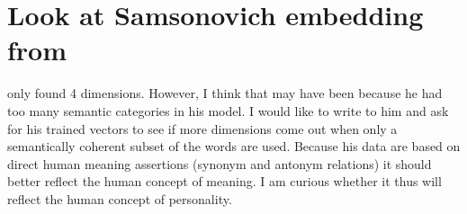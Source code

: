 \section{Look at Samsonovich embedding from }

\citep{Samsonovich2010} only found 4 dimensions. However, I think that may have been 
because he had too many semantic categories in his model. I would like to
write to him and ask for his trained vectors to see if more dimensions come out
when only a semantically coherent subset of the words are used. Because his
data are based on direct human meaning assertions (synonym and antonym 
relations) it should better reflect the human concept of meaning. I am 
curious whether it thus will reflect the human concept of personality.
